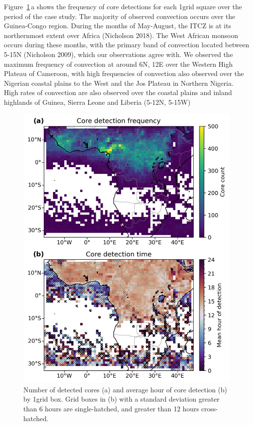 Figure~\ref{fig:seviri_map_dists}\,a shows the frequency of core detections for each 1\textdegree grid
square over the period of the case study. The majority of observed
convection occurs over the Guinea-Congo region. During the months of
May-August, the ITCZ is at its northernmost extent over Africa
(Nicholson 2018). The West African monsoon occurs during these
months, with the primary band of convection located between 5-15\textdegree N
(Nicholson 2009), which our observations agree with. We observed the
maximum frequency of convection at around 6\textdegree N, 12\textdegree E over the Western
High Plateau of Cameroon, with high frequencies of convection also
observed over the Nigerian coastal plains to the West and the Jos
Plateau in Northern Nigeria. High rates of convection are also observed
over the coastal plains and inland highlands of Guinea, Sierra Leone and
Liberia (5-12\textdegree N, 5-15\textdegree W)


\begin{figure}[tp]
    \includegraphics[width=\textwidth]{figures/ch3_05.png}
    \caption[
    Number of detected cores and average hour of core detection
    ]{
    Number of detected cores (a) and average hour of core detection (b) by 1\textdegree grid box. Grid boxes in (b) with a standard deviation greater than 6 hours are single-hatched, and greater than 12 hours cross-hatched.
    }
    \label{fig:seviri_map_dists}
\end{figure}


